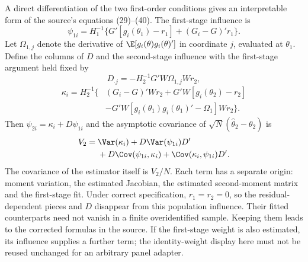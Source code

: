 A direct differentiation of the two first-order conditions gives an
interpretable form of the source's equations (29)--(40). The first-stage
influence is
\[
 \psi_{1i}=H_1^{-1}
 \{G'[g_i(\theta_1)-r_1]+(G_i-G)'r_1\}.
\]
Let $\Omega_{1,j}$ denote the derivative of
$\E[g_i(\theta)g_i(\theta)']$ in coordinate $j$, evaluated at
$\theta_1$. Define the columns of $D$ and the second-stage influence
with the first-stage argument held fixed by
\[
 D_{\cdot j}=-H_2^{-1}G'W\Omega_{1,j}Wr_2,
\]
\[
 \begin{split}
 \kappa_i=H_2^{-1}\bigl\{&(G_i-G)'Wr_2
                +G'W[g_i(\theta_2)-r_2]\\
                &-G'W[g_i(\theta_1)g_i(\theta_1)'-\Omega_1]Wr_2
                    \bigr\}.
 \end{split}
\]
Then $\psi_{2i}=\kappa_i+D\psi_{1i}$ and the asymptotic covariance
of $\sqrt N(\hat\theta_2-\theta_2)$ is
\[
 \begin{split}
 V_2={}&\Var(\kappa_i)+D\Var(\psi_{1i})D'\\
       &+D\Cov(\psi_{1i},\kappa_i)
          +\Cov(\kappa_i,\psi_{1i})D'.
 \end{split}
\]
The covariance of the estimator itself is $V_2/N$. Each term has a
separate origin: moment variation, the estimated Jacobian, the estimated
second-moment matrix and the first-stage fit. Under correct specification,
$r_1=r_2=0$, so the residual-dependent pieces and $D$ disappear from
this population influence. Their fitted counterparts need not vanish
in a finite overidentified sample. Keeping them leads to the corrected
formulas in the source. If the first-stage weight is also estimated,
its influence supplies a further term; the identity-weight display here
must not be reused unchanged for an arbitrary panel adapter.

